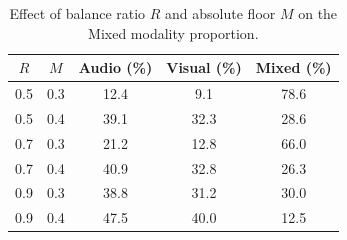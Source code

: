 \begin{table}[h]
  \centering
  \small
  \caption{Effect of balance ratio $R$ and absolute floor $M$ on the Mixed modality proportion.}
  \label{tab:mixed_ablation}
  \begin{tabular}{ccccc}
    \toprule
    \textbf{$R$} & \textbf{$M$} & \textbf{Audio (\%)} & \textbf{Visual (\%)} & \textbf{Mixed (\%)} \\
    \midrule
    0.5 & 0.3 & 12.4 & \phantom{0}9.1 & 78.6 \\
    0.5 & 0.4 & 39.1 & 32.3 & 28.6 \\
    0.7 & 0.3 & 21.2 & 12.8 & 66.0 \\
    0.7 & 0.4 & 40.9 & 32.8 & 26.3 \\
    0.9 & 0.3 & 38.8 & 31.2 & 30.0 \\
    0.9 & 0.4 & 47.5 & 40.0 & 12.5 \\
    \bottomrule
  \end{tabular}
  \vspace{-0.5em}
\end{table}
